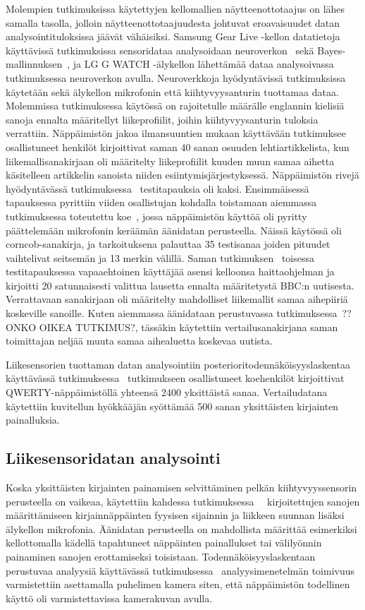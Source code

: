 \documentclass[finnish]{tktltiki2}
\theoremstyle{definition}
\theoremstyle{remark}
\begin{document}
Molempien tutkimuksissa käytettyjen kellomallien näytteenottotaajus on lähes samalla tasolla, jolloin näytteenottotaajuudesta johtuvat eroavaisuudet datan analysointituloksissa jäävät vähäisiksi. Samsung Gear Live -kellon datatietoja käyttävissä tutkimuksissa sensoridataa analysoidaan neuroverkon~\cite{maiti} sekä Bayes-mallinnuksen~\cite{mole}, ja LG G WATCH -älykellon lähettämää dataa analysoivassa tutkimuksessa neuroverkon avulla. Neuroverkkoja hyödyntävissä tutkimuksissa~\cite{maiti}~\cite{liu} käytetään sekä älykellon mikrofonin että kiihtyvyysanturin tuottamaa dataa. Molemmissa tutkimuksessa käytössä on rajoitetulle määrälle englannin kielisiä sanoja ennalta määritellyt liikeprofiilit, joihin kiihtyvyysanturin tuloksia verrattiin. Näppäimistön jakoa ilmansuuntien mukaan käyttävään tutkimuksee~\cite{maiti} osallistuneet henkilöt kirjoittivat saman 40 sanan osuuden lehtiartikkelista, kun liikemallisanakirjaan oli määritelty liikeprofiilit kuuden muun samaa aihetta käsitelleen artikkelin sanoista niiden esiintymisjärjestyksessä.
Näppäimistön rivejä hyödyntävässä tutkimuksessa~\cite{liu} testitapauksia oli kaksi. Ensimmäisessä tapauksessa pyrittiin viiden osallistujan kohdalla toistamaan aiemmassa tutkimuksessa toteutettu koe~\cite{berger}, jossa näppäimistön käyttöä oli pyritty päättelemään mikrofonin keräämän äänidatan perusteella. Näissä käytössä oli corncob-sanakirja, ja tarkoituksena palauttaa 35 testisanaa joiden pituudet vaihtelivat seitsemän ja 13 merkin välillä. 
Saman tutkimuksen~\cite{liu} toisessa testitapauksessa vapaaehtoinen käyttäjää asensi kelloonsa haittaohjelman ja kirjoitti 20 satunnaisesti valittua lausetta ennalta määritetystä BBC:n uutisesta. Verrattavaan sanakirjaan oli määritelty mahdolliset liikemallit samaa aihepiiriä koskeville sanoille. Kuten aiemmassa äänidataan perustuvassa tutkimuksessa~\cite{mar}??ONKO OIKEA TUTKIMUS?, tässäkin käytettiin vertailusanakirjana saman toimittajan neljää muuta samaa aihealuetta koskevaa uutista. 

Liikesensorien tuottaman datan analysointiin posterioritodennäköisyyslaskentaa käyttävässä tutkimuksessa~\cite{mole} tutkimukseen osallistuneet koehenkilöt kirjoittivat QWERTY-näppäimistöllä yhteensä 2400 yksittäistä sanaa. Vertailudatana käytettiin kuvitellun hyökkääjän syöttämää 500 sanan yksittäisten kirjainten painalluksia.


\subsection{Liikesensoridatan analysointi}
Koska yksittäisten kirjainten painamisen selvittäminen pelkän kiihtyvyyssensorin perusteella on vaikeaa, käytettiin kahdessa tutkimuksessa~\cite{maiti}~\cite{liu} kirjoitettujen sanojen määrittämiseen kirjainnäppäinten fyysisen sijainnin ja liikkeen suunnan lisäksi älykellon mikrofonia. Äänidatan perusteella on mahdollista määrittää esimerkiksi kellottomalla kädellä tapahtuneet näppäinten painallukset tai välilyönnin painaminen sanojen erottamiseksi toisistaan. Todennäköisyyslaskentaan perustuvaa analyysiä käyttävässä tutkimuksessa~\cite{mole} analyysimenetelmän toimivuus varmistettiin asettamalla puhelimen kamera siten, että näppäimistön todellinen käyttö oli varmistettavissa kamerakuvan avulla.
\end{document}
